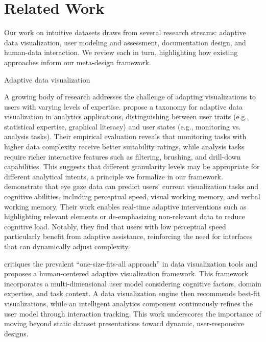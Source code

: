 \documentclass[]{hdsr}
\makeatletter
\def\subsection{\@startsection{subsection}{2}%
  \z@{.5\linespacing\@plus.7\linespacing}{.5\linespacing}%
  {\normalfont\bfseries}}
\theoremstyle{plain}      %
\theoremstyle{definition} %
\theoremstyle{remark}     %
\makeatother
\begin{document}
\section{Related Work}
\label{sec:related-work}

Our work on intuitive datasets draws from several research streams: adaptive data visualization, user modeling and assessment, documentation design, and human-data interaction. We review each in turn, highlighting how existing approaches inform our meta-design framework.

\subsection{Adaptive data visualization}

A growing body of research addresses the challenge of adapting visualizations to users with varying levels of expertise. \citet{poetzsch2020towardataxonomy} propose a taxonomy for adaptive data visualization in analytics applications, distinguishing between user traits (e.g., statistical expertise, graphical literacy) and user states (e.g., monitoring vs. analysis tasks). Their empirical evaluation reveals that monitoring tasks with higher data complexity receive better suitability ratings, while analysis tasks require richer interactive features such as filtering, brushing, and drill-down capabilities. This suggests that different granularity levels may be appropriate for different analytical intents, a principle we formalize in our framework.
\vspace{1em}
\noindent \citet{steichen2013useradaptiveinformationvisualisation} demonstrate that eye gaze data can predict users' current visualization tasks and cognitive abilities, including perceptual speed, visual working memory, and verbal working memory. Their work enables real-time adaptive interventions such as highlighting relevant elements or de-emphasizing non-relevant data to reduce cognitive load. Notably, they find that users with low perceptual speed particularly benefit from adaptive assistance, reinforcing the need for interfaces that can dynamically adjust complexity.

\vspace{1em}

\noindent \citet{amyrotos2021adaptivevisualisationsfor} critiques the prevalent ``one-size-fits-all approach'' in data visualization tools and proposes a human-centered adaptive visualization framework. This framework incorporates a multi-dimensional user model considering cognitive factors, domain expertise, and task context. A data visualization engine then recommends best-fit visualizations, while an intelligent analytics component continuously refines the user model through interaction tracking. This work underscores the importance of moving beyond static dataset presentations toward dynamic, user-responsive designs.
\end{document}
